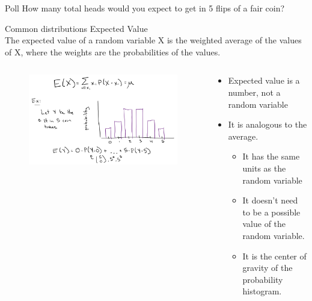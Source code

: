 \documentclass[aspectratio=169]{../latex_main/tntbeamer}  %
\begin{document}
	\begin{frame}[c]{Poll }
	   How many total heads would you expect to get in 5 flips of a fair coin?
	\end{frame}
	
	
	
	
	\begin{frame}[c]{Common distributions}
	       Expected Value\\
	            The expected value of a random variable X is the weighted average of the values of X, where the weights are the probabilities of the values.

	   \begin{columns}
	        \begin{column}{.4\textwidth}
	            \begin{figure}
	                \centering
	                \includegraphics[scale=.5]{Bild20}
	            \end{figure}
	        \end{column}
	            
	        \begin{column}{.4\textwidth}
	            \begin{itemize}
	                \item Expected value is a number, not a random variable
	                \item It is analogous to the average.
	                \begin{itemize}
	                    \item It has the same units as the random variable
	                    \item It doesn’t need to be a possible value of the random variable.
	                    \item It is the center of gravity of the probability histogram.
	                \end{itemize}
	            \end{itemize}
	        \end{column}
	    \end{columns}

	\end{frame}
	
\end{document}
